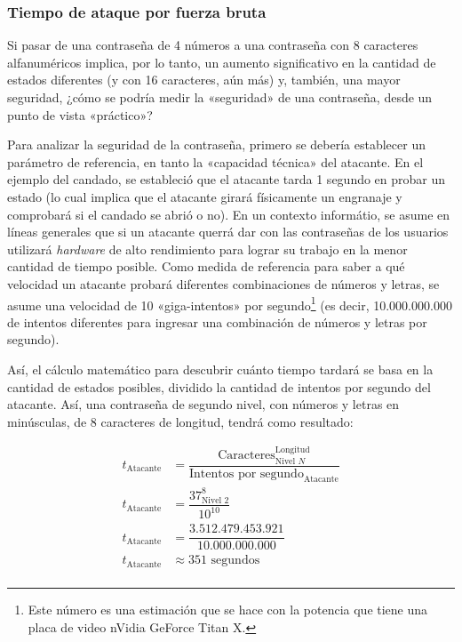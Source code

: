 \documentclass[12pt,a4paper,twoside]{book}
\begin{document}
\subsubsection{Tiempo de ataque por fuerza bruta}
Si pasar de una contraseña de 4 números a una contraseña con 8 caracteres alfanuméricos implica, por lo tanto, un aumento significativo en la cantidad de estados diferentes (y con 16 caracteres, aún más) y, también, una mayor seguridad, ¿cómo se podría medir la «seguridad» de una contraseña, desde un punto de vista «práctico»?

Para analizar la seguridad de la contraseña, primero se debería establecer un parámetro de referencia, en tanto la «capacidad técnica» del atacante. En el ejemplo del candado, se estableció que el atacante tarda 1 segundo en probar un estado (lo cual implica que el atacante girará físicamente un engranaje y comprobará si el candado se abrió o no). En un contexto informátio, se asume en líneas generales que si un atacante querrá dar con las contraseñas de los usuarios utilizará \textit{hardware} de alto rendimiento para lograr su trabajo en la menor cantidad de tiempo posible. Como medida de referencia para saber a qué velocidad un atacante probará diferentes combinaciones de números y letras, se asume una velocidad de 10 «giga-intentos» por segundo\footnote{Este número es una estimación que se hace con la potencia que tiene una placa de video nVidia GeForce Titan X.} (es decir, 10.000.000.000 de intentos diferentes para ingresar una combinación de números y letras por segundo).

Así, el cálculo matemático para descubrir cuánto tiempo tardará se basa en la cantidad de estados posibles, dividido la cantidad de intentos por segundo del atacante. Así, una contraseña de segundo nivel, con números y letras en minúsculas, de 8 caracteres de longitud, tendrá como resultado:

\begin{align*}
t_{\text{Atacante}} &= \dfrac{\text{Caracteres}^{\text{Longitud}}_{\text{Nivel } N}}{\text{Intentos por segundo}_\text{Atacante}} \\
t_{\text{Atacante}} &= \dfrac{37^{8}_{\text{Nivel } 2}}{10^{10}} \\
t_{\text{Atacante}} &= \dfrac{3.512.479.453.921}{10.000.000.000} \\
t_{\text{Atacante}} &\approx 351 \text{ segundos} \\
\end{align*}
\end{document}
